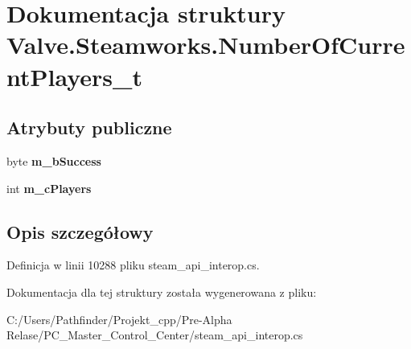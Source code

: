 \hypertarget{struct_valve_1_1_steamworks_1_1_number_of_current_players__t}{}\section{Dokumentacja struktury Valve.\+Steamworks.\+Number\+Of\+Current\+Players\+\_\+t}
\label{struct_valve_1_1_steamworks_1_1_number_of_current_players__t}
\subsection*{Atrybuty publiczne}
\begin{DoxyCompactItemize}
\item 
\mbox{\label{struct_valve_1_1_steamworks_1_1_number_of_current_players__t_a99f198eb9ba3dd62b76816c2fb90d121}} 
byte {\bfseries m\+\_\+b\+Success}
\item 
\mbox{\label{struct_valve_1_1_steamworks_1_1_number_of_current_players__t_a6c31b37b2c3fc429f678af199c9b122c}} 
int {\bfseries m\+\_\+c\+Players}
\end{DoxyCompactItemize}


\subsection{Opis szczegółowy}


Definicja w linii 10288 pliku steam\+\_\+api\+\_\+interop.\+cs.



Dokumentacja dla tej struktury została wygenerowana z pliku\+:\begin{DoxyCompactItemize}
\item 
C\+:/\+Users/\+Pathfinder/\+Projekt\+\_\+cpp/\+Pre-\/\+Alpha Relase/\+P\+C\+\_\+\+Master\+\_\+\+Control\+\_\+\+Center/steam\+\_\+api\+\_\+interop.\+cs\end{DoxyCompactItemize}
